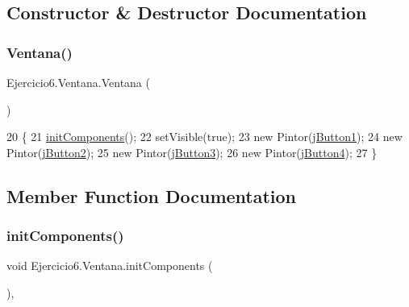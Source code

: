 \subsection{Constructor \& Destructor Documentation}
\mbox{\label{class_ejercicio6_1_1_ventana_ae3dbf01a448d02dcc9a5b858e902ca23}} 
\subsubsection{\texorpdfstring{Ventana()}{Ventana()}}
{\footnotesize\ttfamily Ejercicio6.\+Ventana.\+Ventana (\begin{DoxyParamCaption}{ }\end{DoxyParamCaption})\hspace{0.3cm}{\ttfamily [inline]}}


\begin{DoxyCode}
20                      \{
21         \mbox{\hyperlink{class_ejercicio6_1_1_ventana_a0e149e1c8087dce9a724c6e8e4b8ca7d}{initComponents}}();
22         setVisible(\textcolor{keyword}{true});
23         \textcolor{keyword}{new} Pintor(\mbox{\hyperlink{class_ejercicio6_1_1_ventana_ad44d1eb3a44301c300133e494094fa82}{jButton1}});
24         \textcolor{keyword}{new} Pintor(\mbox{\hyperlink{class_ejercicio6_1_1_ventana_a2ed2a64625ce0750faff659b6877db2a}{jButton2}});
25         \textcolor{keyword}{new} Pintor(\mbox{\hyperlink{class_ejercicio6_1_1_ventana_a5e56d7fdd53c855b57547c618c29838a}{jButton3}});
26         \textcolor{keyword}{new} Pintor(\mbox{\hyperlink{class_ejercicio6_1_1_ventana_a2ec5afa2ee7fdb55cebb1e2809f4a662}{jButton4}});
27     \}
\end{DoxyCode}


\subsection{Member Function Documentation}
\mbox{\label{class_ejercicio6_1_1_ventana_a0e149e1c8087dce9a724c6e8e4b8ca7d}} 
\subsubsection{\texorpdfstring{init\+Components()}{initComponents()}}
{\footnotesize\ttfamily void Ejercicio6.\+Ventana.\+init\+Components (\begin{DoxyParamCaption}{ }\end{DoxyParamCaption})\hspace{0.3cm}{\ttfamily [inline]}, {\ttfamily [private]}}


